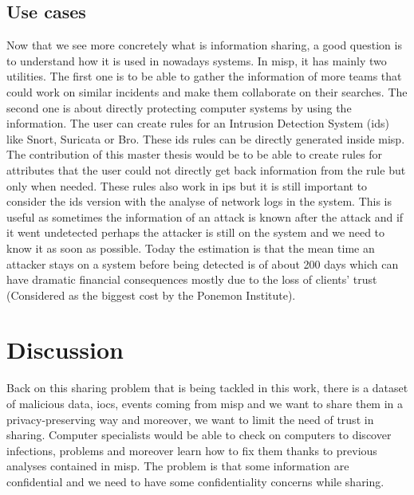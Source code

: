 \documentclass{eplmastersthesis}
\begin{document}
\subsection{Use cases}
Now that we see more concretely what is information sharing, a good question is to understand how it is used in nowadays systems. In \gls{misp}, it has mainly two utilities. The first one is to be able to gather the information of more teams that could work on similar incidents and make them collaborate on their searches.
The second one is about directly protecting computer systems by using the information. The user can create rules for an Intrusion Detection System (\gls{ids}) like Snort, Suricata or Bro. These \gls{ids} rules can be directly generated inside \gls{misp}. The contribution of this master thesis would be to be able to create rules for attributes that the user could not directly get back information from the rule but only when needed.
These rules also work in \gls{ips} but it is still important to consider the \gls{ids} version with the analyse of network logs in the system. This is useful as sometimes the information of an attack is known after the attack and if it went undetected perhaps the attacker is still on the system and we need to know it as soon as possible.
Today the estimation is that the mean time an attacker stays on a system before being detected is of about 200 days which can have dramatic financial consequences mostly due to the loss of clients' trust (Considered as the biggest cost by the Ponemon Institute).\\

\section{Discussion}

Back on this sharing problem that is being tackled in this work, there is a dataset of malicious data, \gls{ioc}s, events coming from \gls{misp} and we want to share them in a privacy-preserving way and moreover, we want to limit the need of trust in sharing.
Computer specialists would be able to check on computers to discover infections, problems and moreover learn how to fix them thanks to previous analyses contained in \gls{misp}. The problem is that some information are confidential and we need to have some confidentiality concerns while sharing. \\
\end{document}
